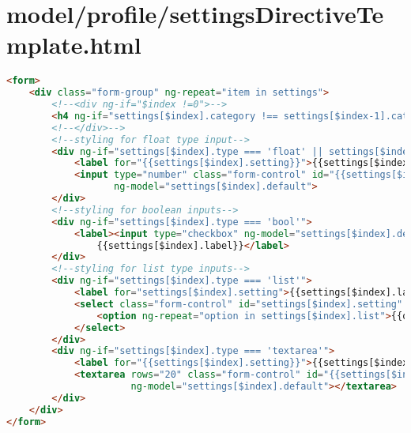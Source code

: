 \section{model/profile/settingsDirectiveTemplate.html}
\begin{lstlisting}[language=HTML, label={lst:settingsDirectiveTemplate}, caption=This HTML snippet decides what kind of setting needs to be displayed and shows it.]
<form>
    <div class="form-group" ng-repeat="item in settings">
        <!--<div ng-if="$index !=0">-->
        <h4 ng-if="settings[$index].category !== settings[$index-1].category"><bold>{{settings[$index].category}}</bold></h4>
        <!--</div>-->
        <!--styling for float type input-->
        <div ng-if="settings[$index].type === 'float' || settings[$index].type === 'int'">
            <label for="{{settings[$index].setting}}">{{settings[$index].label}}</label>
            <input type="number" class="form-control" id="{{settings[$index].setting}}"
                   ng-model="settings[$index].default">
        </div>
        <!--styling for boolean inputs-->
        <div ng-if="settings[$index].type === 'bool'">
            <label><input type="checkbox" ng-model="settings[$index].default">
                {{settings[$index].label}}</label>
        </div>
        <!--styling for list type inputs-->
        <div ng-if="settings[$index].type === 'list'">
            <label for="settings[$index].setting">{{settings[$index].label}}</label>
            <select class="form-control" id="settings[$index].setting" ng-model="settings[$index].default">
                <option ng-repeat="option in settings[$index].list">{{option}}</option>
            </select>
        </div>
        <div ng-if="settings[$index].type === 'textarea'">
            <label for="{{settings[$index].setting}}">{{settings[$index].label}}</label>
            <textarea rows="20" class="form-control" id="{{settings[$index].setting}}"
                      ng-model="settings[$index].default"></textarea>
        </div>
    </div>
</form>
\end{lstlisting}

